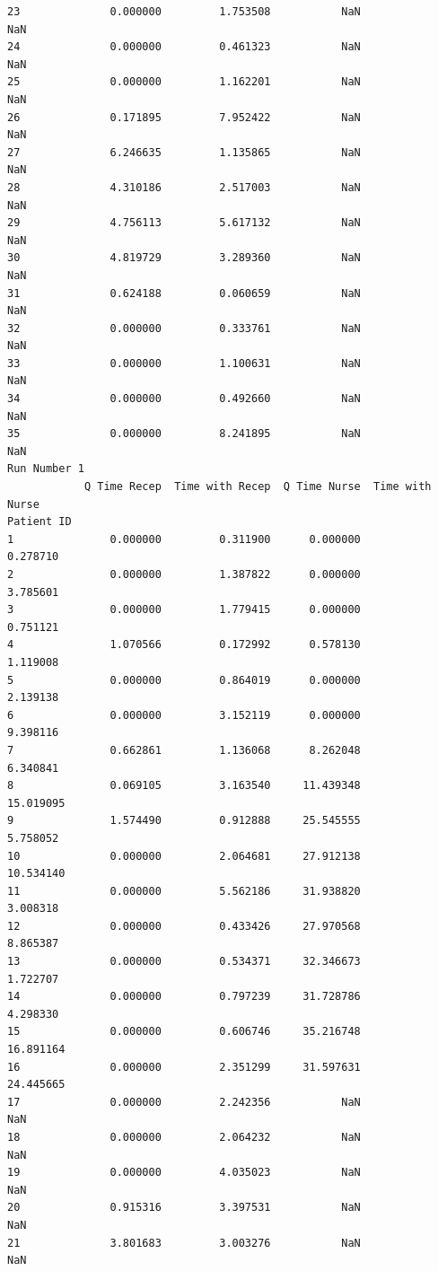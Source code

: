 \documentclass[
  letterpaper,
  DIV=11,
  numbers=noendperiod]{scrreprt}
\begin{document}
\begin{verbatim}
23              0.000000         1.753508           NaN              NaN
24              0.000000         0.461323           NaN              NaN
25              0.000000         1.162201           NaN              NaN
26              0.171895         7.952422           NaN              NaN
27              6.246635         1.135865           NaN              NaN
28              4.310186         2.517003           NaN              NaN
29              4.756113         5.617132           NaN              NaN
30              4.819729         3.289360           NaN              NaN
31              0.624188         0.060659           NaN              NaN
32              0.000000         0.333761           NaN              NaN
33              0.000000         1.100631           NaN              NaN
34              0.000000         0.492660           NaN              NaN
35              0.000000         8.241895           NaN              NaN
Run Number 1
            Q Time Recep  Time with Recep  Q Time Nurse  Time with Nurse
Patient ID                                                              
1               0.000000         0.311900      0.000000         0.278710
2               0.000000         1.387822      0.000000         3.785601
3               0.000000         1.779415      0.000000         0.751121
4               1.070566         0.172992      0.578130         1.119008
5               0.000000         0.864019      0.000000         2.139138
6               0.000000         3.152119      0.000000         9.398116
7               0.662861         1.136068      8.262048         6.340841
8               0.069105         3.163540     11.439348        15.019095
9               1.574490         0.912888     25.545555         5.758052
10              0.000000         2.064681     27.912138        10.534140
11              0.000000         5.562186     31.938820         3.008318
12              0.000000         0.433426     27.970568         8.865387
13              0.000000         0.534371     32.346673         1.722707
14              0.000000         0.797239     31.728786         4.298330
15              0.000000         0.606746     35.216748        16.891164
16              0.000000         2.351299     31.597631        24.445665
17              0.000000         2.242356           NaN              NaN
18              0.000000         2.064232           NaN              NaN
19              0.000000         4.035023           NaN              NaN
20              0.915316         3.397531           NaN              NaN
21              3.801683         3.003276           NaN              NaN

\end{verbatim}
\end{document}
